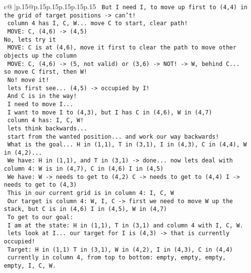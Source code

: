 \documentclass{article}
\begin{document}
{\begin{supertabular}{c@{$\;$}|p{.15\linewidth}@{}p{.15\linewidth}p{.15\linewidth}p{.15\linewidth}p{.15\linewidth}p{.15\linewidth}}
{{{\texttt{ But I need I, to move up first to (4,4) in the grid of target positions {-}> can't!} \\
\texttt{ column 4 has I, C, W... move C to start, clear path!} \\
\texttt{ MOVE: C, (4,6) {-}> (4,5) } \\
\texttt{No, lets try it} \\
\texttt{ MOVE: C is at (4,6), move it first to clear the path to move other objects up the column} \\
\texttt{ MOVE: C, (4,6) {-}> (5, not valid) or (3,6) {-}> NOT! {-}> W, behind C... so move C first, then W!} \\
\texttt{ No! move it!} \\
\texttt{ lets first see... (4,5) {-}> occupied by I!} \\
\texttt{ And C is in the way!} \\
\texttt{ I need to move I...} \\
\texttt{ I want to move I to (4,3), but I has C in (4,6), W in (4,7)} \\
\texttt{ column 4 has: I, C, W!} \\
\texttt{ lets think backwards...} \\
\texttt{ start from the wanted position... and work our way backwards!} \\
\texttt{ What is the goal... H in (1,1), T in (3,1), I in (4,3), C in (4,4), W in (4,2)... } \\
\texttt{ We have: H in (1,1), and T in (3,1) {-}> done... now lets deal with column 4: W is in (4,7), C in (4,6) I in (4,5)} \\
\texttt{ We have: W {-}> needs to get to (4,2) C {-}> needs to get to (4,4) I {-}> needs to get to (4,3)} \\
\texttt{ This in our current grid is in column 4: I, C, W} \\
\texttt{ Our target is column 4: W, I, C {-}> first we need to move W up the stack, but C is in (4,6) I in (4,5), W in (4,7)} \\
\texttt{ To get to our goal: } \\
\texttt{ I am at the state: H in (1,1), T in (3,1) and column 4 with I, C, W.} \\
\texttt{ lets look at I... our target for I is (4,3) {-}> that is currently occupied!} \\
\texttt{ Target: H in (1,1) T in (3,1), W in (4,2), I in (4,3), C in (4,4) } \\
\texttt{ currently in column 4, from top to bottom: empty, empty, empty, empty, I, C, W.} \\
}}}
\end{supertabular}}
\end{document}
